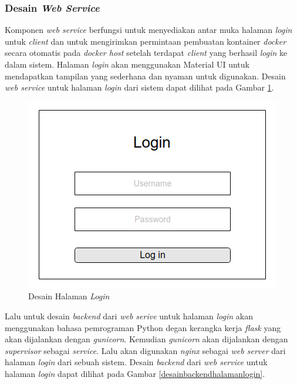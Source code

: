 	\subsubsection{Desain \textit{Web Service}}
	Komponen \textit{web service} berfungsi untuk menyediakan antar muka halaman \textit{login} untuk \textit{client} dan untuk mengirimkan permintaan pembuatan kontainer \textit{docker} secara otomatis pada \textit{docker host} setelah terdapat \textit{client} yang berhasil \textit{login} ke dalam sistem. Halaman \textit{login} akan menggunakan Material UI untuk mendapatkan tampilan yang sederhana dan nyaman untuk digunakan. Desain \textit{web service} untuk halaman \textit{login} dari sistem dapat dilihat pada Gambar \ref{mockuplogin}.
	
	\begin{figure}[H]
		\centering
		\includegraphics[width=\linewidth]{images/bab3/MockupLogin}
		\caption{Desain Halaman \textit{Login}}
		\label{mockuplogin}
	\end{figure}
	
	Lalu untuk desain \textit{backend} dari \textit{web serive} untuk halaman \textit{login} akan menggunakan bahasa pemrograman Python degan kerangka kerja \textit{flask} yang akan dijalankan dengan \textit{gunicorn}. Kemudian \textit{gunicorn} akan dijalankan dengan \textit{supervisor} sebagai \textit{service}. Lalu akan digunakan \textit{nginx} sebagai \textit{web server} dari halaman \textit{login} dari sebuah sistem. Desain \textit{backend} dari \textit{web service} untuk halaman \textit{login} dapat dilihat pada Gambar \ref{desainbackendhalamanlogin}.
	
